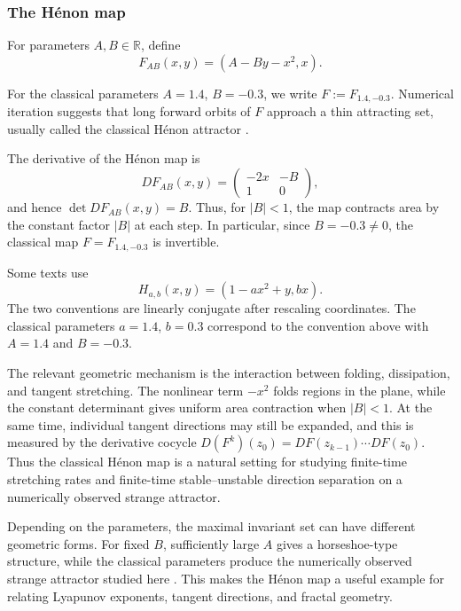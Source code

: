 \subsubsection{The Hénon map}
\label{sec:Hénon-map}

    \begin{definition}
    For parameters \(A,B\in\mathbb R\), define
    \[
    F_{AB}(x,y) = (A-By-x^2,x).
    \]
    \end{definition}

    For the classical parameters $A=1.4$, $B=-0.3$, we write $ F:=F_{1.4,-0.3}$. Numerical iteration suggests that long forward orbits of \(F\) approach a thin attracting set, usually called the classical Hénon attractor \cite{Henon1976,Robinson1999}.

   
    The derivative of the Hénon map is
    \[
    DF_{AB}(x,y) =
    \begin{pmatrix}
    -2x & -B\\
    1 & 0
    \end{pmatrix},
    \]
    and hence $\det DF_{AB}(x,y)=B$. Thus, for \(|B|<1\), the map contracts area by the constant factor \(|B|\) at each step. In particular, since \(B=-0.3\neq0\), the classical map \(F=F_{1.4,-0.3}\) is invertible.

    
    \begin{remark}
    Some texts use
    \[
    H_{a,b}(x,y)=(1-ax^2+y,bx).
    \] The two conventions are linearly conjugate after rescaling coordinates.
    The classical parameters \(a=1.4\), \(b=0.3\) correspond to the convention above with $A=1.4$ and $B=-0.3$.
    \end{remark}

    The relevant geometric mechanism is the interaction between folding, dissipation, and tangent stretching. The nonlinear term \(-x^2\) folds regions in the plane, while the constant determinant gives uniform area contraction when \(|B|<1\). At the same time, individual tangent directions may still be expanded, and this is measured by the derivative cocycle  $D(F^k)(z_0)
    =
    DF(z_{k-1})\cdots DF(z_0).$
    Thus the classical Hénon map is a natural setting for studying finite-time stretching rates and finite-time stable--unstable direction separation on a numerically observed strange attractor.
    
    Depending on the parameters, the maximal invariant set can have different geometric forms. For fixed \(B\), sufficiently large \(A\) gives a horseshoe-type structure, while the classical parameters produce the numerically observed strange attractor studied here \cite{Robinson1999}. This makes the Hénon map a useful example for relating Lyapunov exponents, tangent directions, and fractal geometry.
   

